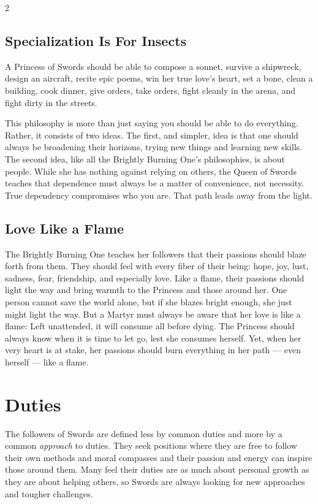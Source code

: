\begin{multicols}{2}
\subsection*{Specialization Is For Insects}

A Princess of Swords should be able to compose a sonnet, survive a shipwreck, design an aircraft, recite epic poems, win her true love's heart, set a bone, clean a building, cook dinner, give orders, take orders, fight cleanly in the arena, and fight dirty in the streets. 

This philosophy is more than just saying you should be able to do everything. Rather, it consists of two ideas. The first, and simpler, idea is that one should always be broadening their horizons, trying new things and learning new skills. The second idea, like all the Brightly Burning One's philosophies, is about people. While she has nothing against relying on others, the Queen of Swords teaches that dependence must always be a matter of convenience, not necessity. True dependency compromises who you are. That path leads away from the light. 

\subsection*{Love Like a Flame}

The Brightly Burning One teaches her followers that their passions should blaze forth from them. They should feel with every fiber of their being: hope, joy, lust, sadness, fear, friendship, and especially love. Like a flame, their passions should light the way and bring warmth to the Princess and those around her. One person cannot save the world alone, but if she blazes bright enough, she just might light the way. But a Martyr must always be aware that her love is like a flame: Left unattended, it will consume all before dying. The Princess should always know when it is time to let go, lest she consumes herself. Yet, when her very heart is at stake, her passions should burn everything in her path — even herself — like a flame. 

\section*{Duties}

The followers of Swords are defined less by common duties and more by a common \textit{approach} to duties. They seek positions where they are free to follow their own methods and moral compasses and their passion and energy can inspire those around them. Many feel their duties are as much about personal growth as they are about helping others, so Swords are always looking for new approaches and tougher challenges.


\end{multicols}
